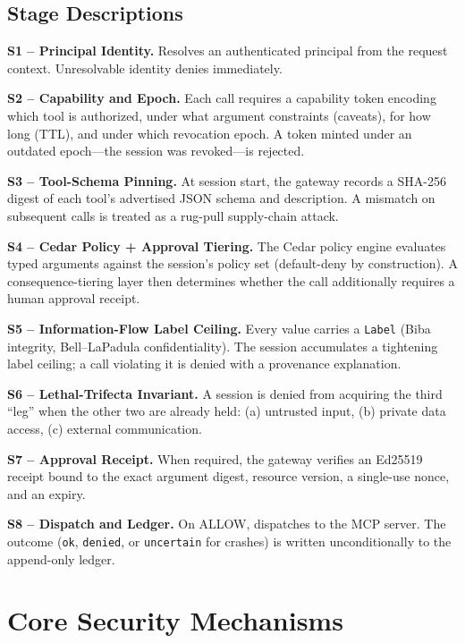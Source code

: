 \documentclass[10pt,conference]{IEEEtran}
\begin{document}
\subsection{Stage Descriptions}

\textbf{S1 -- Principal Identity.} Resolves an authenticated principal from
the request context. Unresolvable identity denies immediately.

\textbf{S2 -- Capability and Epoch.} Each call requires a capability
token encoding which tool is authorized, under what argument constraints
(caveats), for how long (TTL), and under which revocation epoch. A token
minted under an outdated epoch---the session was revoked---is rejected.

\textbf{S3 -- Tool-Schema Pinning.} At session start, the gateway records a
SHA-256 digest of each tool's advertised JSON schema and description. A
mismatch on subsequent calls is treated as a rug-pull supply-chain attack.

\textbf{S4 -- Cedar Policy + Approval Tiering.} The Cedar policy engine
evaluates typed arguments against the session's policy set (default-deny by
construction). A consequence-tiering layer then determines whether the call
additionally requires a human approval receipt.

\textbf{S5 -- Information-Flow Label Ceiling.} Every value carries a
\texttt{Label} (Biba integrity, Bell--LaPadula confidentiality). The session
accumulates a tightening label ceiling; a call violating it is denied with
a provenance explanation.

\textbf{S6 -- Lethal-Trifecta Invariant.} A session is denied from
acquiring the third ``leg'' when the other two are already held: (a)
untrusted input, (b) private data access, (c) external communication.

\textbf{S7 -- Approval Receipt.} When required, the gateway verifies an
Ed25519 receipt bound to the exact argument digest, resource version, a
single-use nonce, and an expiry.

\textbf{S8 -- Dispatch and Ledger.} On ALLOW, dispatches to the MCP
server. The outcome (\texttt{ok}, \texttt{denied}, or \texttt{uncertain}
for crashes) is written unconditionally to the append-only ledger.

\section{Core Security Mechanisms}
\end{document}
